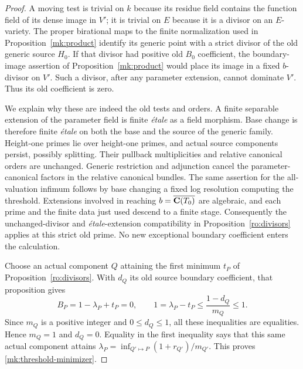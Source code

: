 \begin{proof}
A moving test is trivial on $k$ because its residue field contains the
function field of its dense image in $V'$; it is trivial on $E$ because
it is a divisor on an $E$-variety.  The proper birational maps to the
finite normalization used in Proposition~\ref{mk:product} identify its
generic point with a strict divisor of the old generic source $H_0$.
If that divisor had positive old $B_0$ coefficient, the boundary-image
assertion of Proposition~\ref{mk:product} would place its image in a
fixed $b$-divisor on $V'$.  Such a divisor, after any parameter extension,
cannot dominate $V'$.  Thus its old coefficient is zero.

We explain why these are indeed the old tests and orders.  A finite
separable extension of the parameter field is finite \emph{\'etale} as
a field morphism.  Base change is therefore finite \emph{\'etale} on
both the base and the source of the generic family.  Height-one primes
lie over height-one primes, and actual source components persist,
possibly splitting.  Their pullback multiplicities and relative
canonical orders are unchanged.  Generic restriction and adjunction
cancel the parameter-canonical factors in the relative canonical
bundles.  The same assertion for the all-valuation infimum follows by
base changing a fixed log resolution computing the threshold.
Extensions involved in reaching $b=\overline{\mathbf C(T_0)}$ are algebraic,
and each prime and the finite data just used descend to a finite stage.
Consequently the unchanged-divisor and \emph{\'etale}-extension
compatibility in Proposition~\ref{ro:divisors} applies at this strict old
prime.  No new exceptional boundary coefficient enters the calculation.

Choose an actual component $Q$ attaining the first minimum $t_P$ of
Proposition~\ref{ro:divisors}.  With $d_Q$ its old source boundary
coefficient, that proposition gives
\[
 B_P=1-\lambda_P+t_P=0,
 \qquad
 1=\lambda_P-t_P
 \leq\frac{1-d_Q}{m_Q}\leq1.
\]
Since $m_Q$ is a positive integer and $0\leq d_Q\leq1$, all these
inequalities are equalities.  Hence $m_Q=1$ and $d_Q=0$.  Equality in
the first inequality says that this same actual component attains
$\lambda_P=\inf_{Q'\mapsto P}(1+r_{Q'})/m_{Q'}$.  This proves
\eqref{mk:threshold-minimizer}.
\end{proof}
